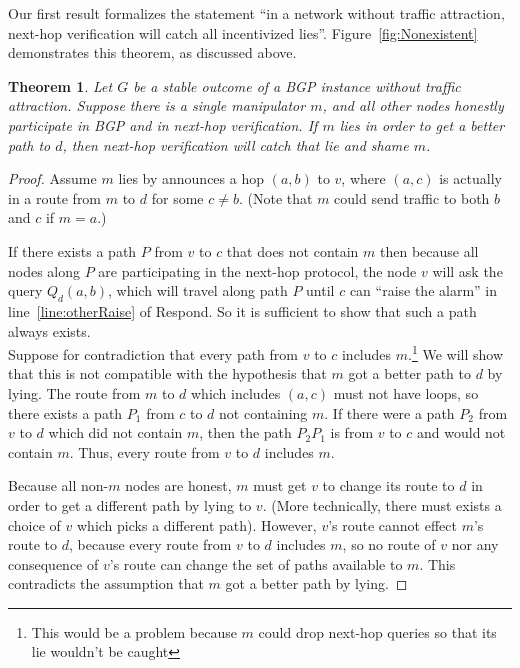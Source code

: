 \documentclass[10pt]{article}
\newtheorem{theorem}{Theorem}
\begin{document}
  Our first result formalizes the statement ``in a network without
  traffic attraction, next-hop verification will catch all incentivized lies''.
  Figure~\ref{fig:Nonexistent} demonstrates this theorem, as discussed above.
  \begin{theorem}
    Let $G$ be a stable outcome of a BGP instance without traffic attraction.
    Suppose there is a single manipulator $m$,
    and all other nodes honestly participate in BGP and in next-hop verification.
    If $m$ lies in order to get a better path to $d$,
    then next-hop verification will catch that lie and shame $m$.
  \end{theorem}
  \begin{proof}
    Assume $m$ lies by announces a hop $(a,b)$ to $v$, where $(a,c)$ is actually in
    a route from $m$ to $d$ for some $c\ne b$.
    (Note that $m$ could send traffic to both $b$ and $c$ if $m=a$.)
    
    If there exists a path $P$ from $v$ to $c$ that does not contain $m$ then
    because all nodes along $P$ are participating in the next-hop protocol,
    the node $v$ will ask the query $Q_d(a,b)$, which will travel along path $P$
    until $c$ can ``raise the alarm'' in line~\ref{line:otherRaise} of {\sc
    Respond}. So it is sufficient to show that such a path always exists.\\
    
    Suppose for contradiction that every path from $v$ to $c$ includes $m$.\footnote{This would be a problem because $m$ could drop next-hop queries so that its lie wouldn't be caught}
    We will show that
    this is not compatible with the hypothesis that $m$ got a better path to $d$ by lying.
    The route from $m$ to $d$ which includes $(a,c)$ must not have loops, so there exists
    a path $P_1$ from $c$ to $d$ not containing $m$.
    If there were a path $P_2$ from $v$ to $d$ which did not contain $m$, then the
    path $P_2P_1$ is from $v$ to $c$ and would not contain $m$.
    Thus, every route from $v$ to $d$ includes $m$.

    Because all non-$m$ nodes are honest, $m$ must get $v$ to change its route
    to $d$ in order to get a different path by lying to $v$.
    (More technically, there must exists a choice of
    $v$ which picks a different path).
    However, $v$'s route cannot effect $m$'s route to $d$, because
    every route from $v$ to $d$ includes $m$,
    so no route of $v$ nor any consequence of $v$'s route can change the set of
    paths available to $m$.
    This contradicts the assumption that $m$ got a better path by lying.
  \end{proof}
\end{document}
